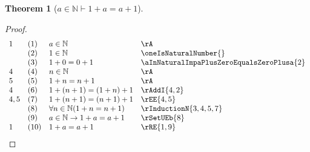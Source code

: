 \documentclass{book}
\theoremstyle{plain}
\newtheorem{theorem}{Theorem}
\theoremstyle{remark}
\theoremstyle{definition}
\begin{document}
\label{aInNaturalImpOnePlusaEqualsaPlusOne}
\begin{theorem}[\(a\in\mathbb{N}\vdash 1+a=a+1\)]
\end{theorem}
\begin{proof}
        \[
	\begin{array}{llll}
            1   &  (1) & a\in\mathbb{N} & \rA \\
                &  (2) & 1\in\mathbb{N} & \oneIsNaturalNumber{} \\
                &  (3) & 1+0=0+1 & \aInNaturalImpaPlusZeroEqualsZeroPlusa{2} \\
            4   &  (4) & n\in\mathbb{N} & \rA \\
            5   &  (5) & 1+n=n+1 & \rA \\
            4   &  (6) & 1+(n+1)=(1+n)+1 & \rAddI{4,2} \\
            4,5 &  (7) & 1+(n+1)=(n+1)+1 & \rEE{4,5} \\
                &  (8) & \forall n\in\mathbb{N}(1+n=n+1) & \rInductionN{3,4,5,7} \\
                &  (9) & a\in\mathbb{N}\rightarrow 1+a=a+1 & \rSetUEb{8} \\
            1   &  (10)&1+a=a+1 & \rRE{1,9} \\
	\end{array}
	\]
\end{proof}
\end{document}
